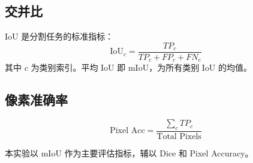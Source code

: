 \subsection{交并比}
IoU 是分割任务的标准指标：
\begin{equation}
    \text{IoU}_c = \frac{TP_c}{TP_c + FP_c + FN_c}
\end{equation}
其中 $c$ 为类别索引。平均 IoU 即 mIoU，为所有类别 IoU 的均值。

\subsection{像素准确率}
\begin{equation}
    \text{Pixel Acc} = \frac{\sum_{c} TP_c}{\text{Total Pixels}}
\end{equation}

本实验以 mIoU 作为主要评估指标，辅以 Dice 和 Pixel Accuracy。
